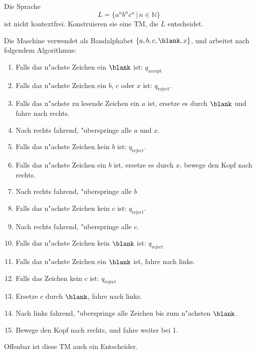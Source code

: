 Die Sprache
\[
L=\{a^nb^nc^n\,|\,n\in \mathbb N\}
\]
ist nicht kontextfrei. Konstruieren sie eine TM, die $L$
entscheidet.

\begin{loesung}
Die Maschine verwendet als Bandalphabet $\{a,b,c,\blank,x\}$,
und arbeitet nach folgendem Algorithmus:
\begin{enumerate}
\item Falls das n"achste Zeichen ein $\blank$ ist:
$q_{\text{accept}}$
\item Falls das n"achste Zeichen ein $b$, $c$ oder $x$ ist:
$q_{\text{reject}}$.
\item Falls das n"achste zu lesende Zeichen ein $a$ ist, ersetze
es durch $\blank$ und fahre nach rechts.
\item Nach rechts fahrend, "uberspringe alle $a$ und $x$.
\item Falls das n"achste Zeichen kein $b$ ist:
$q_{\text{reject}}$.
\item Falls das n"achste Zeichen ein $b$ ist, ersetze es durch $x$,
bewege den Kopf nach rechts.
\item Nach rechts fahrend, "uberspringe alle $b$
\item Falls das n"achste Zeichen kein $c$ ist:
$q_{\text{reject}}$.
\item Nach rechts fahrend, "uberspringe alle $c$.
\item Falls das n"achste Zeichen kein $\blank$ ist: $q_{\text{reject}}$
\item Falls das n"achste Zeichen ein $\blank$ ist, fahre nach
links.
\item Falls das Zeichen kein $c$ ist: $q_{\text{reject}}$
\item Ersetze $c$ durch $\blank$, fahre nach links.
\item Nach links fahrend, "uberspringe alle Zeichen bis zum n"achsten
$\blank$.
\item Bewege den Kopf nach rechts, und fahre weiter bei 1.
\end{enumerate}
Offenbar ist diese TM auch ein Entscheider.


\end{loesung}
